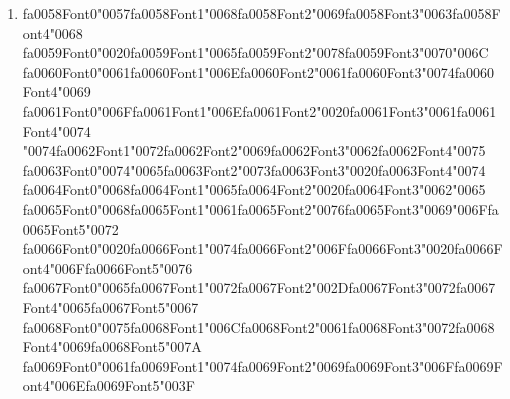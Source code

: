 \documentclass[12pt]{article}
\begin{document}
\begin{enumerate}[label=Q\arabic*.]
 \begin{enumerate}[label=(\Alph*)]
     \item Bag-of-Words representation assumes term independence
     \item IDF overweights rare tokens
     \item Document length normalization distorts similarity
     \item Cosine similarity ignores magnitude differences
 \end{enumerate}
 
 \item {\csname fa0058Font0\endcsname\char"0057}{\csname fa0058Font1\endcsname\char"0068}{\csname fa0058Font2\endcsname\char"0069}{\csname fa0058Font3\endcsname\char"0063}{\csname fa0058Font4\endcsname\char"0068} {\csname fa0059Font0\endcsname\char"0020}{\csname fa0059Font1\endcsname\char"0065}{\csname fa0059Font2\endcsname\char"0078}{\csname fa0059Font3\endcsname\char"0070}{\char"006C} {\csname fa0060Font0\endcsname\char"0061}{\csname fa0060Font1\endcsname\char"006E}{\csname fa0060Font2\endcsname\char"0061}{\csname fa0060Font3\endcsname\char"0074}{\csname fa0060Font4\endcsname\char"0069} {\csname fa0061Font0\endcsname\char"006F}{\csname fa0061Font1\endcsname\char"006E}{\csname fa0061Font2\endcsname\char"0020}{\csname fa0061Font3\endcsname\char"0061}{\csname fa0061Font4\endcsname\char"0074} {\char"0074}{\csname fa0062Font1\endcsname\char"0072}{\csname fa0062Font2\endcsname\char"0069}{\csname fa0062Font3\endcsname\char"0062}{\csname fa0062Font4\endcsname\char"0075} {\csname fa0063Font0\endcsname\char"0074}{\char"0065}{\csname fa0063Font2\endcsname\char"0073}{\csname fa0063Font3\endcsname\char"0020}{\csname fa0063Font4\endcsname\char"0074} {\csname fa0064Font0\endcsname\char"0068}{\csname fa0064Font1\endcsname\char"0065}{\csname fa0064Font2\endcsname\char"0020}{\csname fa0064Font3\endcsname\char"0062}{\char"0065} {\csname fa0065Font0\endcsname\char"0068}{\csname fa0065Font1\endcsname\char"0061}{\csname fa0065Font2\endcsname\char"0076}{\csname fa0065Font3\endcsname\char"0069}{\char"006F}{\csname fa0065Font5\endcsname\char"0072} {\csname fa0066Font0\endcsname\char"0020}{\csname fa0066Font1\endcsname\char"0074}{\csname fa0066Font2\endcsname\char"006F}{\csname fa0066Font3\endcsname\char"0020}{\csname fa0066Font4\endcsname\char"006F}{\csname fa0066Font5\endcsname\char"0076} {\csname fa0067Font0\endcsname\char"0065}{\csname fa0067Font1\endcsname\char"0072}{\csname fa0067Font2\endcsname\char"002D}{\csname fa0067Font3\endcsname\char"0072}{\csname fa0067Font4\endcsname\char"0065}{\csname fa0067Font5\endcsname\char"0067} {\csname fa0068Font0\endcsname\char"0075}{\csname fa0068Font1\endcsname\char"006C}{\csname fa0068Font2\endcsname\char"0061}{\csname fa0068Font3\endcsname\char"0072}{\csname fa0068Font4\endcsname\char"0069}{\csname fa0068Font5\endcsname\char"007A} {\csname fa0069Font0\endcsname\char"0061}{\csname fa0069Font1\endcsname\char"0074}{\csname fa0069Font2\endcsname\char"0069}{\csname fa0069Font3\endcsname\char"006F}{\csname fa0069Font4\endcsname\char"006E}{\csname fa0069Font5\endcsname\char"003F}

\end{enumerate}
\end{document}
